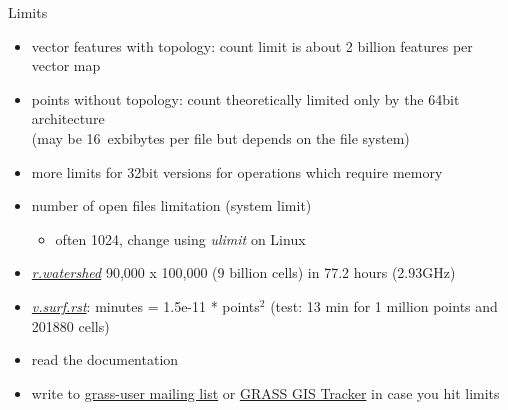 \documentclass[xcolor={dvipsnames,usenames},beamer,aspectratio=169]{beamer}
\newcommand{\gmodule}[1]{\href{http://grass.osgeo.org/grass71/manuals/#1.html}{\emph{#1}}}
\begin{document}
\begin{frame}{Limits}

\begin{itemize}
  \item vector features with topology:
    count limit is about 2 billion features per vector map
  \item points without topology:
    count theoretically limited only by the 64bit architecture\\
    (may be 16~exbibytes per file but depends on the file system)
  \item more limits for 32bit versions for operations which require memory
  \item number of open files limitation (system limit)
  \begin{itemize}
   \item often 1024, change using \emph{ulimit} on Linux
  \end{itemize}
  \item \gmodule{r.watershed} 90,000 x 100,000 (9 billion cells) in 77.2 hours (2.93GHz)
  \item
    \gmodule{v.surf.rst}: minutes = 1.5e-11 * points$^2$
    {\footnotesize (test: 13 min for 1 million points and 201880 cells)}
  \item read the documentation
  \item write to \href{https://lists.osgeo.org/listinfo/grass-user}{grass-user mailing list}
    or \href{http://trac.osgeo.org/grass/}{GRASS GIS Tracker} in case you hit limits
\end{itemize}

\end{frame}
\end{document}
